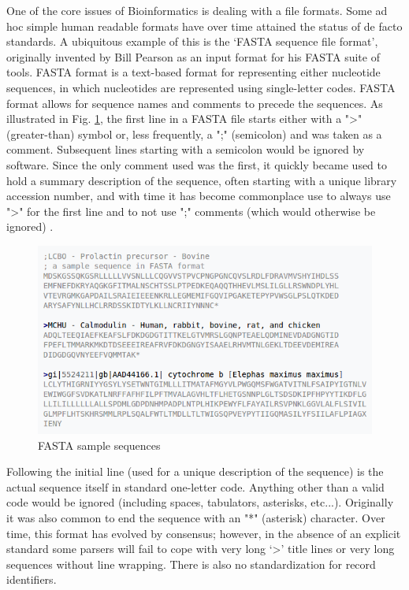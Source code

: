 \documentclass[12pt]{llncs}
\begin{document}
\newpage
One of the core issues of Bioinformatics is dealing with a file formats. Some ad hoc simple human readable formats have over time attained the status of de facto standards. A ubiquitous example of this is the ‘FASTA sequence file format’, originally invented by Bill Pearson as an input format for his FASTA suite of tools.
FASTA format is a text-based format for representing either nucleotide sequences, in which nucleotides are represented using single-letter codes. FASTA format allows for sequence names and comments to precede the sequences. As illustrated in Fig. \ref{fig:fig-NGS-5}, the first line in a FASTA file starts either with a "\textgreater" (greater-than) symbol or, less frequently, a ";" (semicolon) and was taken as a comment. Subsequent lines starting with a semicolon would be ignored by software. Since the only comment used was the first, it quickly became used to hold a summary description of the sequence, often starting with a unique library accession number, and with time it has become commonplace use to always use "\textgreater" for the first line and to not use ";" comments (which would otherwise be ignored) \cite{fasta-fastq1}.
\begin{figure}
	\centering
	\includegraphics[width=.911\linewidth]{./figs/NGS-5}
	\caption{\label{fig:fig-NGS-5}FASTA sample sequences}
\end{figure}
Following the initial line (used for a unique description of the sequence) is the actual sequence itself in standard one-letter code. Anything other than a valid code would be ignored (including spaces, tabulators, asterisks, etc...). Originally it was also common to end the sequence with an "*" (asterisk) character. 
Over time, this format has evolved by consensus; however, in the absence of an explicit standard some parsers will fail to cope with very long ‘\textgreater’ title lines or very long sequences without line wrapping. There is also no standardization for record identifiers.
\end{document}
